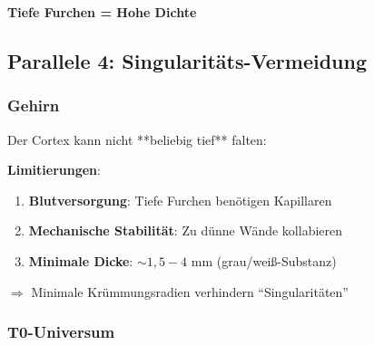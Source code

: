	\begin{keyresult}
		\textbf{Tiefe Furchen = Hohe Dichte}

		\vspace{0.3cm}

		\begin{center}
		\end{center}
	\end{keyresult}

	\subsection{Parallele 4: Singularitäts-Vermeidung}

	\subsubsection{Gehirn}

	Der Cortex kann nicht **beliebig tief** falten:

	\textbf{Limitierungen}:
	\begin{enumerate}
		\item \textbf{Blutversorgung}: Tiefe Furchen benötigen Kapillaren
		\item \textbf{Mechanische Stabilität}: Zu dünne Wände kollabieren
		\item \textbf{Minimale Dicke}: $\sim 1,5 - 4$ mm (grau/weiß-Substanz)
	\end{enumerate}

	$\Rightarrow$ Minimale Krümmungsradien verhindern \enquote{Singularitäten}

	\subsubsection{T0-Universum}

